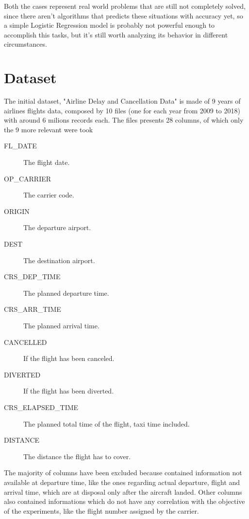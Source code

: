 \documentclass[
	letterpaper, %
	10pt, %
]{class}
\begin{document}
Both the cases represent real world problems that are still not completely solved, since there aren't algorithms that predicts these situations with accuracy yet, so a simple Logistic Regression model is probably not powerful enough to accomplish this tasks, but it's still worth analyzing its behavior in different circumstances.


\section{Dataset}

The initial dataset, "Airline Delay and Cancellation Data" \cite{dataset} is made of 9 years of airlines flights data, composed by 10 files (one for each year from 2009 to 2018) with around 6 milions records each.
The files presents 28 columns, of which only the 9 more relevant were took\\

\begin{description}
    \item[FL\_DATE] The flight date.
    \item[OP\_CARRIER] The carrier code.
    \item[ORIGIN] The departure airport.
    \item[DEST] The destination airport.
    \item[CRS\_DEP\_TIME] The planned departure time.
    \item[CRS\_ARR\_TIME] The planned arrival time.
    \item[CANCELLED] If the flight has been canceled.
    \item[DIVERTED] If the flight has been diverted.
    \item[CRS\_ELAPSED\_TIME] The planned total time of the flight, taxi time included.
    \item[DISTANCE] The distance the flight has to cover.\\
\end{description}

The majority of columns have been excluded because contained information not available at departure time, like the ones regarding actual departure, flight and arrival time, which are at disposal only after the aircraft landed.
Other columns also contained informations which do not have any correlation with the objective of the experiments, like the flight number assigned by the carrier.\\
\end{document}

